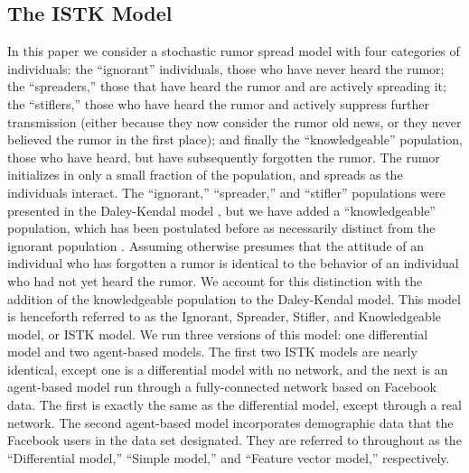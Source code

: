 \subsection{The ISTK Model}
\label{subsec:istk}

In this paper we consider a stochastic rumor spread model with four categories of individuals: the ``ignorant'' individuals, those who have never heard the rumor; the ``spreaders,'' those that have heard the rumor and are actively spreading it; the ``stiflers,'' those who have heard the rumor and actively suppress further transmission (either because they now consider the rumor old news, or they never believed the rumor in the first place); and finally the ``knowledgeable'' population, those who have heard, but have subsequently forgotten the rumor.
The rumor initializes in only a small fraction of the population, and spreads as the individuals interact.
The ``ignorant,'' ``spreader,'' and ``stifler'' populations were presented in the Daley-Kendal model \cite{daley-1965}, but we have added a ``knowledgeable'' population, which has been postulated before as necessarily distinct from the ignorant population \cite{zhao-2012, zhao-2011}.
Assuming otherwise presumes that the attitude of an individual who has forgotten a rumor is identical to the behavior of an individual who had not yet heard the rumor.
We account for this distinction with the addition of the knowledgeable population to the Daley-Kendal model.
This model is henceforth referred to as the Ignorant, Spreader, Stifler, and Knowledgeable model, or ISTK model.
We run three versions of this model: one differential model and two agent-based models.
The first two ISTK models are nearly identical, except one is a differential model with no network, and the next is an agent-based model run through a fully-connected network based on Facebook data.
The first is exactly the same as the differential model, except through a real network.
The second agent-based model incorporates demographic data that the Facebook users in the data set designated.
They are referred to throughout as the ``Differential model,''  ``Simple model,'' and ``Feature vector model,'' respectively.

